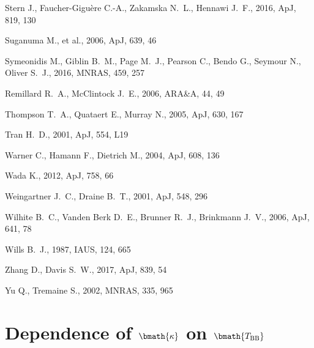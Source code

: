 \documentclass[a4paper,fleqn,usenatbib]{mnras}
\begin{document}
\begin{thebibliography}{99}
 Stern J., Faucher-Gigu{\`e}re C.-A., Zakamska N.~L., Hennawi J.~F., 2016, ApJ, 819, 130 

 Suganuma M., et al., 2006, ApJ, 639, 46 

 Symeonidis M., Giblin B.~M., Page M.~J., Pearson C., Bendo G., Seymour N., Oliver S.~J., 2016, MNRAS, 459, 257
 
 Remillard R.~A., McClintock J.~E., 2006, ARA\&A, 44, 49 

 Thompson T.~A., Quataert E., Murray N., 2005, ApJ, 630, 167 

 Tran H.~D., 2001, ApJ, 554, L19 

 Warner C., Hamann F., Dietrich M., 2004, ApJ, 608, 136 

 Wada K., 2012, ApJ, 758, 66 

 Weingartner J.~C., Draine B.~T., 2001, ApJ, 548, 296
 
 Wilhite B.~C., Vanden Berk D.~E., Brunner R.~J., Brinkmann J.~V., 2006, ApJ, 641, 78
 
 Wills B.~J., 1987, IAUS, 124, 665 

 Zhang D., Davis S.~W., 2017, ApJ, 839, 54 

 Yu Q., Tremaine S., 2002, MNRAS, 335, 965 
	
\end{thebibliography}

\appendix
\section{Dependence of $\bmath{\kappa}$ on $\bmath{T_{\rm BB}}$} \label{sec:appendix}
\end{document}
